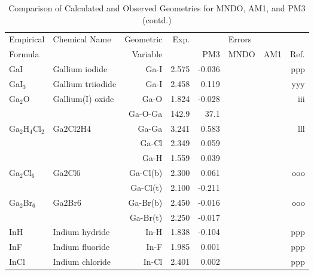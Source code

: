 \begin{table}
\caption{\label{geotabo}Comparison of Calculated and Observed Geometries for 
MNDO, AM1, and PM3 (contd.)}
\begin{center}
\compresstable
\begin{tabular}{llrrrrrr}
 Empirical  & Chemical Name &  Geometric &  Exp. & \multicolumn{3}{c}{Errors} & \\
  Formula   &               &  Variable &        & PM3  & MNDO  &  AM1 & Ref.\\
\hline
 GaI         & Gallium iodide                     &Ga-I           &     2.575   &    -0.036 &  &  &   ppp \\
 GaI$_3$        & Gallium triiodide                  &Ga-I           &     2.458   &     0.119 &  &  &   yyy \\
 Ga$_2$O        & Gallium(I) oxide                   &Ga-O           &     1.824   &    -0.028 &  &  &   iii \\
             &                                    &Ga-O-Ga      &     142.9   &      37.1 &  &    &       \\
 Ga$_2$H$_4$Cl$_2$    & Ga2Cl2H4                           &Ga-Ga          &     3.241   &     0.583 &  &  &   lll \\
             &                                    &Ga-Cl          &     2.349   &     0.059 &  &  &       \\
             &                                    &Ga-H           &     1.559   &     0.039 &  &  &       \\
 Ga$_2$Cl$_6$      & Ga2Cl6                             &Ga-Cl(b)       &     2.300   &     0.061 &  &  &   ooo \\
             &                                    &Ga-Cl(t)       &     2.100   &    -0.211 &  &  &       \\
 Ga$_2$Br$_6$      & Ga2Br6                             &Ga-Br(b)       &     2.450   &    -0.016 &  &  &   ooo \\
             &                                    &Ga-Br(t)       &     2.250   &    -0.017 &  &  &       \\
 InH         & Indium hydride                     &In-H           &     1.838   &    -0.104 &  &  &   ppp \\
 InF         & Indium fluoride                    &In-F           &     1.985   &     0.001 &  &  &   ppp \\
 InCl        & Indium chloride                    &In-Cl          &     2.401   &     0.002 &  &  &   ppp \\

\end{tabular}
\end{center}
\end{table}
